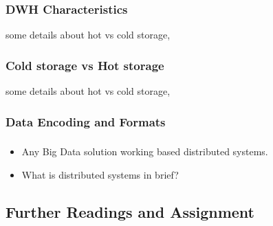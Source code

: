 \begin{frame}
\frametitle{DWH Characteristics}


some details about hot vs cold storage,

\end{frame}

\begin{frame}

\frametitle{Cold storage vs Hot storage}

some details about hot vs cold storage,

\end{frame}

\subsubsection{Data Encoding and Formats}
\begin{frame}
\frametitle{\subsecname}
\begin{itemize}[<+->]
\item Any Big Data solution working based distributed systems.
\item What is distributed systems in brief?
\end{itemize}
\end{frame}

\subsection{Further Readings and Assignment}


